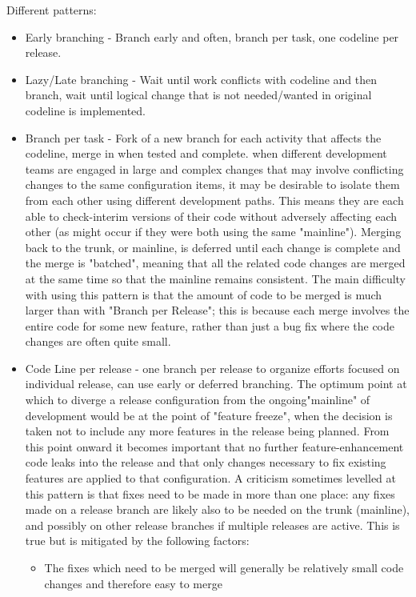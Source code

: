 \documentclass{article}
\begin{document}
Different patterns:
\begin{itemize}
    \item Early branching - Branch early and often, branch per task, one codeline per release.
    \item Lazy/Late branching - Wait until work conflicts with codeline and then branch, wait until logical change that is not needed/wanted in original codeline is implemented.
    \item Branch per task - Fork of a new branch for each activity that affects the codeline, merge in when tested and complete.
    when different development teams are engaged in large and complex changes that may involve conflicting changes to the same configuration items,
    it may be desirable to isolate them from each other using different development paths.
    This means they are each able to check-interim versions of their code without adversely affecting each other (as might occur if they were both using the same "mainline").
    Merging back to the trunk, or mainline, is deferred until each change is complete and the merge is "batched", meaning that all the related code changes are merged at the same time
    so that the mainline remains consistent.
    The main difficulty with using this pattern is that the amount of code to be merged is much larger than with "Branch per Release";
    this is because each merge involves the entire code for some new feature,
    rather than just a bug fix where the code changes are often quite small.
    \item Code Line per release - one branch per release to organize efforts focused on individual release, can use early or deferred branching.
    The optimum point at which to diverge a release configuration from the ongoing"mainline" of development would be at the point of "feature freeze",
    when the decision is taken not to include any more features in the release being planned.
    From this point onward it becomes important that no further feature-enhancement code leaks into the release and that only changes necessary
    to fix existing features are applied to that configuration.
    A criticism sometimes levelled at this pattern is that fixes need to be made in more than one place:
    any fixes made on a release branch are likely also to be needed on the trunk (mainline), and possibly on other release branches if multiple releases are active.
    This is true but is mitigated by the following factors:
    \begin{itemize}
        \item The fixes which need to be merged will generally be relatively small code changes and therefore easy to merge

\end{itemize}
\end{itemize}
\end{document}
